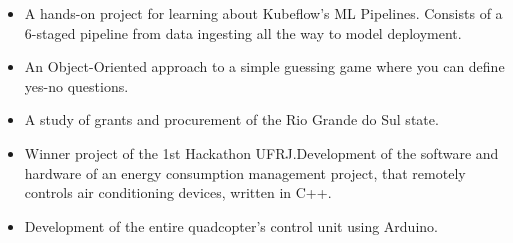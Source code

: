\documentclass[10pt,a4paper,ragged2e,withhyper]{altacv}
\begin{document}
\begin{paracol}{2}
            \begin{itemize}
                \item A hands-on project for learning about Kubeflow's ML Pipelines. Consists of a 6-staged pipeline from data ingesting all the way to model deployment.
            \end{itemize}
            \divider
            
            \begin{itemize}
                \item An Object-Oriented approach to a simple guessing game where you can define yes-no questions. 
            \end{itemize}
            \divider
            
            \begin{itemize}
                \item A study of grants and procurement of the Rio Grande do Sul state. 
            \end{itemize}
            \divider
            
            \begin{itemize}
                \item Winner project of the 1st Hackathon UFRJ.Development of the software and hardware of an energy consumption management project, that remotely controls air conditioning devices, written in C++.
            \end{itemize}
            \divider
            
            \begin{itemize}
                \item Development of the entire quadcopter's control unit using Arduino.
            \end{itemize}
    \end{paracol}
\end{document}
